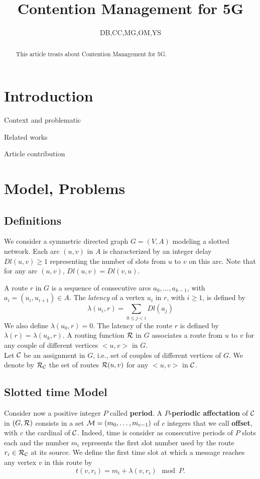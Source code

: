 \documentclass[a4paper,10pt]{article}
\title{Contention Management for 5G}
\author{DB,CC,MG,OM,YS}
\begin{document}
\maketitle

\begin{abstract}
This article treats about Contention Management for 5G.
\end{abstract}

\section{Introduction}
  \itemize
    \item Context and problematic
    \item Related works
    \item Article contribution

\section{Model, Problems}

  \subsection{Definitions}
  
	We consider a symmetric directed graph $G=(V,A)$ modeling a slotted network. Each arc  $(u,v)$ in $A$ is characterized by an integer delay $Dl(u,v) \geq 1$ representing the number of slots from $u$ to $v$ on this arc. Note that for any arc $(u,v)$, $Dl(u,v)=Dl(v,u)$.

      A route $r$ in $G$ is a sequence of consecutive arcs $a_0, \ldots , a_{k-1}$, with $a_i=(u_i,u_{i+1}) \in A$.  The {\em latency} of a vertex $u_i$ in $r$, with $i \geq 1$, is defined by $$\lambda(u_i,r)= \sum\limits_{0 \leq j <i} Dl(a_j)$$ We also define $\lambda(u_0,r)=0$.
      The latency of the route $r$ is defined by $\lambda (r)= \lambda (u_k,r)$.  A routing function $\cal R$ in $G$ associates a route from $u$ to $v$ for any couple of different vertices $<u,v>$ in $G$.\\

      Let $\cal C$ be an {assignment} in $G$, i.e., set of couples of different vertices of $G$. We denote by $\cal R_{\cal C}$ the set of routes ${\cal R}(u,v)$ for any $<u,v>$ in $\cal C$. 

   \subsection{Slotted time Model}
      Consider now a positive integer $P$ called {\bf period}. A {\bf $P$-periodic affectation} of $\cal C$ in $(G,{\cal R})$ consists in a set  ${\cal M}=(m_0, \ldots ,m_{c-1})$
      of $c$ integers that we call {\bf offset}, with $c$ the cardinal of $\cal C$. Indeed, time is consider as consecutive periods of $P$ slots each and the number $m_i$ represents the first slot number used by the route $r_i \in {\cal R}_{\cal C}$ at its source.
      We define the first time slot at which a message reaches any vertex $v$ in this route by $$t(v,r_i) = m_i+\lambda(v,r_i) \mod P.$$
\end{document}
